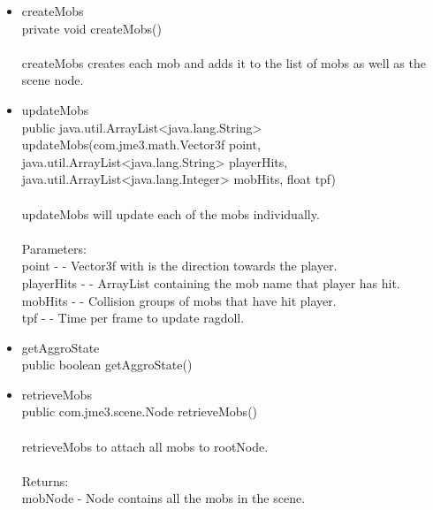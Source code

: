 \documentclass[letterpaper]{article}
\begin{document}
\begin{itemize}
\begin{itemize}
									\item	createMobs \\
											private void createMobs() \\ \\
											createMobs creates each mob and adds it to the list of mobs as well as the scene node. \\
									\item	updateMobs \\
											public java.util.ArrayList<java.lang.String> updateMobs(com.jme3.math.Vector3f point,
											                                               java.util.ArrayList<java.lang.String> playerHits,
											                                               java.util.ArrayList<java.lang.Integer> mobHits,
											                                               float tpf) \\ \\
											updateMobs will update each of the mobs individually. \\ \\
											Parameters: \\
											point - - Vector3f with is the direction towards the player. \\
											playerHits - - ArrayList containing the mob name that player has hit. \\
											mobHits - - Collision groups of mobs that have hit player. \\
											tpf - - Time per frame to update ragdoll. \\
									\item	getAggroState \\
											public boolean getAggroState() \\
									\item	retrieveMobs \\
											public com.jme3.scene.Node retrieveMobs() \\ \\
											retrieveMobs to attach all mobs to rootNode. \\ \\
											Returns: \\
											mobNode - Node contains all the mobs in the scene.
								\end{itemize}
					\end{itemize}
				
				\vspace{0.2in}
\end{document}
